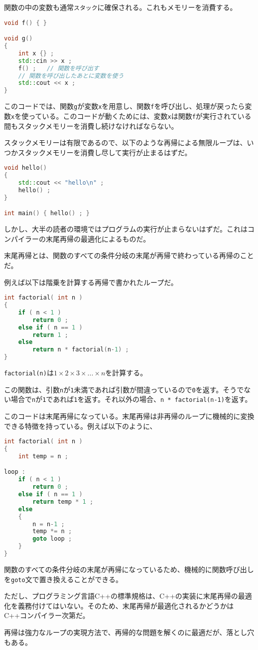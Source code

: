 関数の中の変数も通常\texttt{スタック}に確保される。これもメモリーを消費する。

\begin{lstlisting}[language={C++}]
void f() { }

void g()
{
    int x {} ;
    std::cin >> x ;
    f() ;   // 関数を呼び出す
    // 関数を呼び出したあとに変数を使う
    std::cout << x ;
}
\end{lstlisting}

このコードでは、関数\texttt{g}が変数\texttt{x}を用意し、関数\texttt{f}を呼び出し、処理が戻ったら変数\texttt{x}を使っている。このコードが動くためには、変数\texttt{x}は関数\texttt{f}が実行されている間もスタックメモリーを消費し続けなければならない。

スタックメモリーは有限であるので、以下のような再帰による無限ループは、いつかスタックメモリーを消費し尽して実行が止まるはずだ。

\begin{lstlisting}[language={C++}]
void hello()
{
    std::cout << "hello\n" ;
    hello() ;
}

int main() { hello() ; }
\end{lstlisting}

しかし、大半の読者の環境ではプログラムの実行が止まらないはずだ。これはコンパイラーの末尾再帰の最適化によるものだ。

末尾再帰とは、関数のすべての条件分岐の末尾が再帰で終わっている再帰のことだ。

例えば以下は階乗を計算する再帰で書かれたループだ。

\ifTombow\pagebreak\fi
\begin{lstlisting}[language={C++}]
int factorial( int n )
{
    if ( n < 1 )
        return 0 ;
    else if ( n == 1 )
        return 1 ;
    else
        return n * factorial(n-1) ;
}
\end{lstlisting}

\texttt{factorial(n)}は\(1 \times 2 \times 3 \times ... \times n\)を計算する。

この関数は、引数\texttt{n}が\texttt{1}未満であれば引数が間違っているので\texttt{0}を返す。そうでない場合で\texttt{n}が\texttt{1}であれば\texttt{1}を返す。それ以外の場合、\texttt{n * factorial(n-1)}を返す。

このコードは末尾再帰になっている。末尾再帰は非再帰のループに機械的に変換できる特徴を持っている。例えば以下のように、
\begin{lstlisting}[language={C++}]
int factorial( int n )
{
    int temp = n ;

loop :
    if ( n < 1 )
        return 0 ;
    else if ( n == 1 )
        return temp * 1 ;
    else
    {
        n = n-1 ;
        temp *= n ;
        goto loop ;
    }
}
\end{lstlisting}
関数のすべての条件分岐の末尾が再帰になっているため、機械的に関数呼び出しを\texttt{goto}文で置き換えることができる。

ただし、プログラミング言語C++の標準規格は、C++の実装に末尾再帰の最適化を義務付けてはいない。そのため、末尾再帰が最適化されるかどうかはC++コンパイラー次第だ。

再帰は強力なループの実現方法で、再帰的な問題を解くのに最適だが、落とし穴もある。
